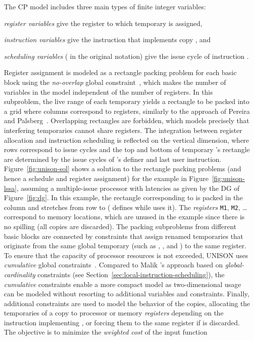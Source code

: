 \documentclass[acmsmall,authorversion,nonacm]{acmart}
\newcommand{\var}[2]{}
\begin{document}
The CP model includes three main types of finite integer variables:
\begin{inparaitem}[]
\item \emph{register variables} \var{r}{t} give the register to
  which temporary  is assigned,
\item \emph{instruction variables} \var{i}{i} give the instruction
  that implements copy , and
\item \emph{scheduling variables} \var{s}{i} ( in the original
  notation) give the issue cycle of instruction .
\end{inparaitem}
Register assignment is modeled as a rectangle packing problem for each
basic block using the \emph{no-overlap} global
constraint~\cite{Beldiceanu2001}, which makes the number of variables
in the model independent of the number of registers.
In this subproblem, the live range of each temporary yields a
rectangle to be packed into a grid where columns correspond to
registers, similarly to the approach of Pereira and
Palsberg~\cite{Pereira2008}.
Overlapping rectangles are forbidden, which models precisely that
interfering temporaries cannot share registers.
The integration between register allocation and instruction scheduling
is reflected on the vertical dimension, where rows correspond to issue
cycles and the top and bottom of temporary 's rectangle are
determined by the issue cycles of 's definer and last user
instruction.
Figure~\ref{fig:unison-sol} shows a solution to the rectangle packing
problems (and hence a schedule and register assignment) for the
example in Figure~\ref{fig:unison-lssa}, assuming a multiple-issue
processor with latencies as given by the DG of Figure~\ref{fig:dg}.
In this example, the rectangle corresponding to  is packed in the
column  and stretches from row
 to  ( defines
 while  uses it).
The \emph{registers} \texttt{M1}, \texttt{M2}, \dots correspond to
memory locations, which are unused in the example since there is no
spilling (all copies are discarded).
The packing subproblems from different basic blocks are connected by
constraints that assign renamed temporaries that originate from the
same global temporary (such as , , and ) to the same
register.
To ensure that the capacity of processor resources is not exceeded,
UNISON uses \emph{cumulative} global constraints~\cite{CPH:global}.
Compared to Malik \etal{}'s approach based on
\emph{global-cardinality} constraints (see
Section~\ref{sec:local-instruction-scheduling}), the \emph{cumulative}
constraints enable a more compact model as two-dimensional usage can
be modeled without resorting to additional variables and constraints.
Finally, additional constraints are used to model the behavior of the
copies, allocating the temporaries of a copy  to processor or
memory \emph{registers} depending on the instruction \var{i}{c}
implementing , or forcing them to the same register if  is
discarded.
The objective is to minimize the \emph{weighted cost} of the input
function
\end{document}
